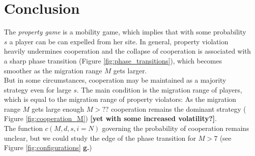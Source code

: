 \section*{Conclusion}
The {\it property game} is a mobility game, which implies that with some probability $s$ a player can be can expelled from her site. In general, property violation heavily undermines cooperation and the collapse of cooperation is associated with a sharp phase transition (Figure \ref{fig:phase_transitions}), which becomes smoother as the migration range $M$ gets larger.\\

But in some circumstances, cooperation may be maintained as a majority strategy even for large $s$. The main condition is the migration range of players, which is equal to the migration range of property violators: As the migration range $M$ gets large enough $M > ??$ cooperation remains the dominant strategy ( Figure \ref{fig:cooperation_M}) {\bf [yet with some increased volatility?]}.\\

The function $c(M,d,s,i=N)$ governing the probability of cooperation remains unclear, but we could study the edge of the phase transition for $M>7$ (see Figure \ref{fig:configurations} {\bf g.})

